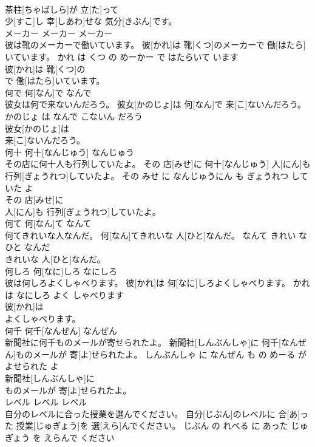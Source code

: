 \documentclass[8pt]{extreport}
\begin{document}
\begin{CJK}{UTF8}{min}
\\	茶柱[ちゃばしら]が 立[た]って
\\	少[すこ]し 幸[しあわ]せな 気分[きぶん]です。			
\\	メーカー	メーカー	メーカー	
\\	彼は靴のメーカーで働いています。	彼[かれ]は 靴[くつ]のメーカーで 働[はたら]いています。	かれ は くつ の めーかー で はたらいて います	
\\	彼[かれ]は 靴[くつ]の
\\	で 働[はたら]いています。			
\\	何で	何[なん]で	なんで	
\\	彼女は何で来ないんだろう。	彼女[かのじょ]は 何[なん]で 来[こ]ないんだろう。	かのじょ は なんで こないん だろう	
\\	彼女[かのじょ]は
\\	来[こ]ないんだろう。			
\\	何十	何十[なんじゅう]	なんじゅう	
\\	その店に何十人も行列していたよ。	その 店[みせ]に 何十[なんじゅう] 人[にん]も 行列[ぎょうれつ]していたよ。	その みせ に なんじゅうにん も ぎょうれつ して いた よ	
\\	その 店[みせ]に
\\	人[にん]も 行列[ぎょうれつ]していたよ。			
\\	何て	何[なん]て	なんて	
\\	何てきれいな人なんだ。	何[なん]てきれいな 人[ひと]なんだ。	なんて きれい な ひと なんだ	
\\	きれいな 人[ひと]なんだ。			
\\	何しろ	何[なに]しろ	なにしろ	
\\	彼は何しろよくしゃべります。	彼[かれ]は 何[なに]しろよくしゃべります。	かれ は なにしろ よく しゃべります	
\\	彼[かれ]は
\\	よくしゃべります。			
\\	何千	何千[なんぜん]	なんぜん	
\\	新聞社に何千ものメールが寄せられたよ。	新聞社[しんぶんしゃ]に 何千[なんぜん]ものメールが 寄[よ]せられたよ。	しんぶんしゃ に なんぜん も の めーる が よせられた よ	
\\	新聞社[しんぶんしゃ]に
\\	ものメールが 寄[よ]せられたよ。			
\\	レベル	レベル	レベル	
\\	自分のレベルに合った授業を選んでください。	自分[じぶん]のレベルに 合[あ]った 授業[じゅぎょう]を 選[えら]んでください。	じぶん の れべる に あった じゅぎょう を えらんで ください	

\end{CJK}
\end{document}
